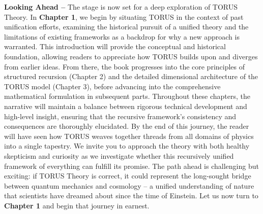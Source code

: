 \documentclass[]{article}
\begin{document}
\textbf{Looking Ahead --} The stage is now set for a deep exploration of
TORUS Theory. In \textbf{Chapter 1}, we begin by situating TORUS in the
context of past unification efforts, examining the historical pursuit of
a unified theory and the limitations of existing frameworks as a
backdrop for why a new approach is warranted. This introduction will
provide the conceptual and historical foundation, allowing readers to
appreciate how TORUS builds upon and diverges from earlier ideas. From
there, the book progresses into the core principles of structured
recursion (Chapter 2) and the detailed dimensional architecture of the
TORUS model (Chapter 3), before advancing into the comprehensive
mathematical formulation in subsequent parts. Throughout these chapters,
the narrative will maintain a balance between rigorous technical
development and high-level insight, ensuring that the recursive
framework's consistency and consequences are thoroughly elucidated. By
the end of this journey, the reader will have seen how TORUS weaves
together threads from all domains of physics into a single tapestry. We
invite you to approach the theory with both healthy skepticism and
curiosity as we investigate whether this recursively unified framework
of everything can fulfill its promise. The path ahead is challenging but
exciting: if TORUS Theory is correct, it could represent the long-sought
bridge between quantum mechanics and cosmology -- a unified
understanding of nature that scientists have dreamed about since the
time of Einstein. Let us now turn to \textbf{Chapter 1} and begin that
journey in earnest.
\end{document}
